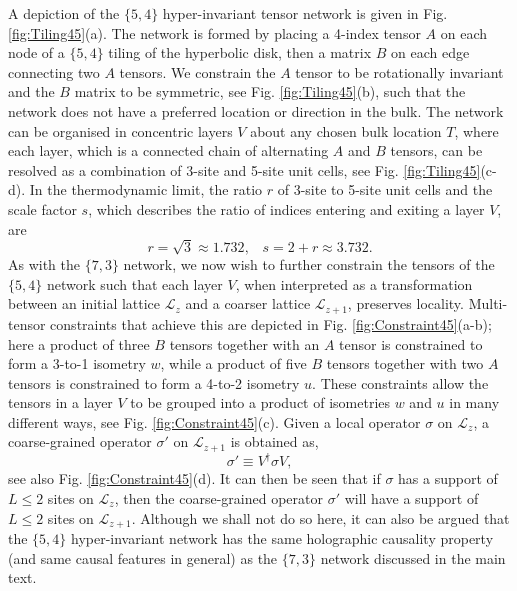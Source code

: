 \documentclass[aps,prl,twocolumn,showpacs,superscriptaddress,floatfix,10pt]{revtex4-1}
\def\L{{\mathcal L}}
\begin{document}
A depiction of the $\{5,4\}$ hyper-invariant tensor network is given in Fig. \ref{fig:Tiling45}(a). The network is formed by placing a 4-index tensor $A$ on each node of a $\{5,4\}$ tiling of the hyperbolic disk, then a matrix $B$ on each edge connecting two $A$ tensors. We constrain the $A$ tensor to be rotationally invariant and the $B$ matrix to be symmetric, see Fig. \ref{fig:Tiling45}(b), such that the network does not have a preferred location or direction in the bulk. The network can be organised in concentric layers $V$ about any chosen bulk location $T$, where each layer, which is a connected chain of alternating $A$ and $B$ tensors, can be resolved as a combination of 3-site and 5-site unit cells, see Fig. \ref{fig:Tiling45}(c-d). In the thermodynamic limit, the ratio $r$ of 3-site to 5-site unit cells and the scale factor $s$, which describes the ratio of indices entering and exiting a layer $V$, are 
\begin{equation}
r = \sqrt{3} \approx 1.732, \; \; \; s = 2+r \approx 3.732.
\end{equation}
As with the $\{7,3\}$ network, we now wish to further constrain the tensors of the $\{5,4\}$ network such that each layer $V$, when interpreted as a transformation between an initial lattice $\L_z$ and a coarser lattice $\L_{z+1}$, preserves locality. Multi-tensor constraints that achieve this are depicted in Fig. \ref{fig:Constraint45}(a-b); here a product of three $B$ tensors together with an $A$ tensor is constrained to form a 3-to-1 isometry $w$, while a product of five $B$ tensors together with two $A$ tensors is constrained to form a 4-to-2 isometry $u$. These constraints allow the tensors in a layer $V$ to be grouped into a product of isometries $w$ and $u$ in many different ways, see Fig. \ref{fig:Constraint45}(c). Given a local operator $\sigma$ on $\L_z$, a coarse-grained operator $\sigma'$ on $\L_{z+1}$ is obtained as,
\begin{equation}
\sigma' \equiv {V^\dag }\sigma V,
\end{equation}
see also Fig. \ref{fig:Constraint45}(d). It can then be seen that if $\sigma$ has a support of $L\le2$ sites on $\L_z$, then the coarse-grained operator $\sigma'$ will have a support of $L\le2$ sites on $\L_{z+1}$. Although we shall not do so here, it can also be argued that the $\{5,4 \}$ hyper-invariant network has the same holographic causality property (and same causal features in general) as the $\{7,3 \}$ network discussed in the main text.
\end{document}
